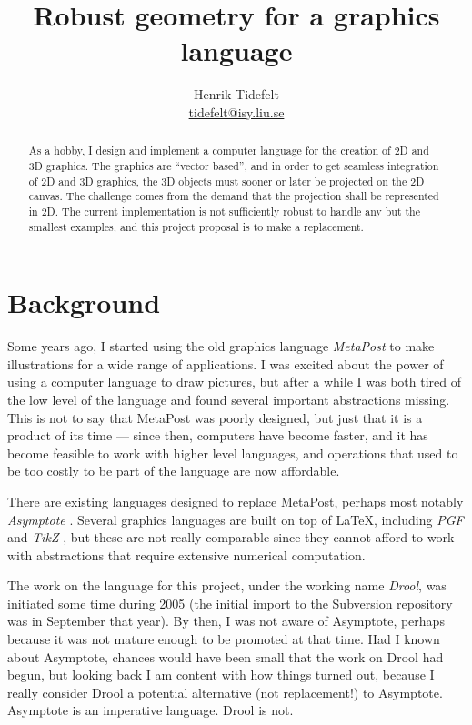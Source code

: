 \documentclass[a4paper]{article}
\title{Robust geometry for a graphics language}
\author{Henrik Tidefelt\\
\href{mailto:tidefelt@isy.liu.se}{\url{tidefelt@isy.liu.se}}}
\begin{document}
\maketitle

\begin{abstract}
  As a hobby, I design and implement a computer language for the creation of 2D and 3D graphics.  The graphics are ``vector based'', and in order to get seamless integration of 2D and 3D graphics, the 3D objects must sooner or later be projected on the 2D canvas.  The challenge comes from the demand that the projection shall be represented in 2D.  The current implementation is not sufficiently robust to handle any but the smallest examples, and this project proposal is to make a replacement.
\end{abstract}

\section*{Background}%
%
Some years ago, I started using the old graphics language \emph{MetaPost} \citep{Hobby94MetaPost} to make illustrations for a wide range of applications.  I was excited about the power of using a computer language to draw pictures, but after a while I was both tired of the low level of the language and found several important abstractions missing.  This is not to say that MetaPost was poorly designed, but just that it is a product of its time --- since then, computers have become faster, and it has become feasible to work with higher level languages, and operations that used to be too costly to be part of the language are now affordable.

There are existing languages designed to replace MetaPost, perhaps most notably \emph{Asymptote} \citep{Asymptote_1.29}.  Several graphics languages are built on top of \LaTeX{}, including \emph{PGF} and \emph{TikZ} \citep{TikZ_PGF_1.00}, but these are not really comparable since they cannot afford to work with abstractions that require extensive numerical computation.

The work on the language for this project, under the working name \emph{Drool}, was initiated some time during 2005 (the initial import to the Subversion repository was in September that year).  By then, I was not aware of Asymptote, perhaps because it was not mature enough to be promoted at that time.  Had I known about Asymptote, chances would have been small that the work on Drool had begun, but looking back I am content with how things turned out, because I really consider Drool a potential alternative (not replacement!) to Asymptote.  Asymptote is an imperative language.  Drool is not.
\end{document}
